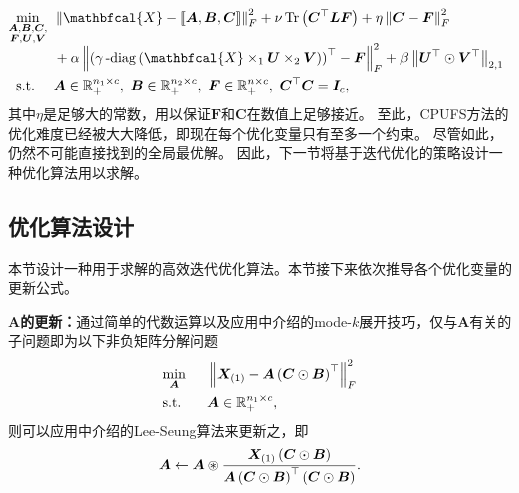 \begin{gather}\label{eq:alterobj}
\begin{aligned}
& \underset{\smash[b]{\substack{\mathclap{\boldsymbol{A},\boldsymbol{B},\boldsymbol{C},}\\\mathclap{\boldsymbol{F},\boldsymbol{U},\boldsymbol{V}}}}}{\min}
& &  \norm{\mathbfcal{X}-\left\llbracket \boldsymbol{A}, \boldsymbol{B}, \boldsymbol{C} \right\rrbracket}_{F}^{2} + \nu\operatorname{Tr}\left(\boldsymbol{C}^{\top}\boldsymbol{L}\boldsymbol{F}\right) + \eta\norm{\boldsymbol{C}-\boldsymbol{F}}_{F}^{2} \\ \span&& + \alpha\norm{\left(\mydiag\left(\mathbfcal{X}\times_{1}\boldsymbol{U}\times_{2}\boldsymbol{V}\right)\right)^{\top} - \boldsymbol{F}}_{F}^{2} + \beta \norm{\boldsymbol{U}^{\top}\odot\boldsymbol{V}^{\top}}_{2,1}\\
& \text{s.t.}
& & \boldsymbol{A}\in \mathbb{R}_{+}^{n_1 \times c},~\boldsymbol{B}\in \mathbb{R}_{+}^{n_2 \times c},~\boldsymbol{F}\in \mathbb{R}_{+}^{n \times c},~\boldsymbol{C}^{\top}\boldsymbol{C} = \boldsymbol{I}_{c},
\end{aligned}
\end{gather}
其中$\eta$是足够大的常数，用以保证$\boldsymbol{F}$和$\boldsymbol{C}$在数值上足够接近。
至此，CPUFS方法的优化难度已经被大大降低，即现在每个优化变量只有至多一个约束。
尽管如此，仍然不可能直接找到的全局最优解。
因此，下一节将基于迭代优化的策略设计一种优化算法用以求解。

\subsection{优化算法设计}
本节设计一种用于求解的高效迭代优化算法。本节接下来依次推导各个优化变量的更新公式。

\textbf{$\boldsymbol{A}$的更新：}通过简单的代数运算以及应用中介绍的mode-$k$展开技巧，仅与$\boldsymbol{A}$有关的子问题即为以下非负矩阵分解问题
\begin{equation*}
    \begin{aligned}
    &\underset{\mathclap{\boldsymbol{A}}}{\min}\Hquad &&\norm{\boldsymbol{X}_{\left(1\right)}-\boldsymbol{A}\left(\boldsymbol{C}\odot\boldsymbol{B}\right)^{\top}}_{F}^{2}\\
    & \text{s.t.} && \boldsymbol{A}\in \mathbb{R}_{+}^{n_1 \times c},
    \end{aligned}
\end{equation*}
则可以应用中介绍的Lee-Seung算法来更新之，即
\begin{equation*}
    \boldsymbol{A}\leftarrow\boldsymbol{A}\oast\frac{\boldsymbol{X}_{(1)}\left(\boldsymbol{C}\odot\boldsymbol{B}\right)}{\boldsymbol{A}\left(\boldsymbol{C}\odot\boldsymbol{B}\right)^{\top}\left(\boldsymbol{C}\odot\boldsymbol{B}\right)}.
\end{equation*}


